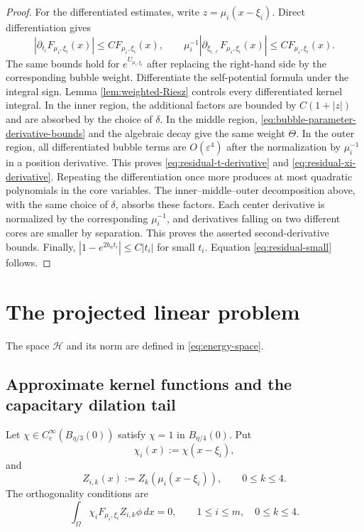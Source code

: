 \documentclass[11pt]{article}
\numberwithin{equation}{section}
\begin{document}
\begin{proof}
For the differentiated estimates, write
$z=\mu_i(x-\xi_i)$. Direct differentiation gives
\begin{equation}\label{eq:bubble-parameter-derivative-bounds}
\left|\partial_{t_i}F_{\mu_i,\xi_i}(x)\right|
\leq CF_{\mu_i,\xi_i}(x),
\qquad
\mu_i^{-1}
\left|\partial_{\xi_{i,\ell}}F_{\mu_i,\xi_i}(x)\right|
\leq CF_{\mu_i,\xi_i}(x).
\end{equation}
The same bounds hold for $e^{U_{\mu_i,\xi_i}}$ after replacing the
right-hand side by the corresponding bubble weight. Differentiate
the self-potential formula under the integral sign. Lemma
\ref{lem:weighted-Riesz} controls every differentiated kernel
integral. In the inner region, the additional factors are bounded by
$C(1+|z|)$ and are absorbed by the choice of $\delta$. In the middle
region, \eqref{eq:bubble-parameter-derivative-bounds} and the
algebraic decay give the same weight $\Theta$. In the outer region,
all differentiated bubble terms are $O(\varepsilon^4)$ after the
normalization by $\mu_i^{-1}$ in a position derivative. This proves
\eqref{eq:residual-t-derivative} and
\eqref{eq:residual-xi-derivative}. Repeating the differentiation once
more produces at most quadratic polynomials in the core variables.
The inner--middle--outer decomposition above, with the same choice of
$\delta$, absorbs these factors. Each center derivative is normalized
by the corresponding $\mu_i^{-1}$, and derivatives falling on two
different cores are smaller by separation. This proves the asserted
second-derivative bounds. Finally,
$|1-e^{2b_\alpha t_i}|\leq C|t_i|$ for small $t_i$.
Equation \eqref{eq:residual-small} follows.
\end{proof}

\section{The projected linear problem}

The space $\mathcal H$ and its norm are defined in
\eqref{eq:energy-space}.

\subsection{Approximate kernel functions and the capacitary dilation tail}

Let $\chi\in C_c^\infty(B_{\eta/3}(0))$ satisfy
$\chi=1$ in $B_{\eta/4}(0)$. Put
\begin{equation*}
\chi_i(x):=\chi(x-\xi_i),
\end{equation*}
and
\begin{equation*}
Z_{i,k}(x):=Z_k(\mu_i(x-\xi_i)),
\qquad 0\leq k\leq4.
\end{equation*}
The orthogonality conditions are
\begin{equation}\label{eq:orthogonality}
\int_\Omega\chi_iF_{\mu_i,\xi_i}Z_{i,k}\phi\,dx=0,
\qquad 1\leq i\leq m,
\quad 0\leq k\leq4.
\end{equation}
\end{document}
